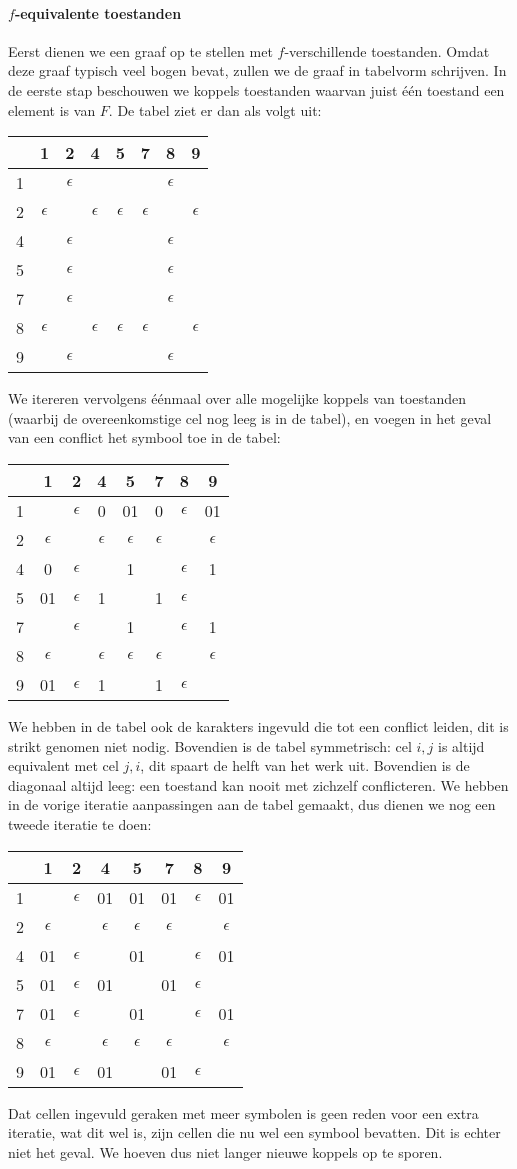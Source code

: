 \documentclass[a4paper]{article}
\newcommand{\statetable}[1]{\begin{center}\begin{tabular}{c|ccccccc}\toprule &1&2&4&5&7&8&9\\\midrule #1 \\\bottomrule\end{tabular}\end{center}}
\newcommand{\e}{\ensuremath{\epsilon}}
\begin{document}
\begin{question}
\paragraph{$f$-equivalente toestanden}
Eerst dienen we een graaf op te stellen met $f$-verschillende toestanden. Omdat deze graaf typisch veel bogen bevat, zullen we de graaf in tabelvorm schrijven. In de eerste stap beschouwen we koppels toestanden waarvan juist \'e\'en toestand een element is van $F$. De tabel ziet er dan als volgt uit:
\statetable{
1&  &\e&  &  &  &\e&  \\
2&\e&  &\e&\e&\e&  &\e\\
4&  &\e&  &  &  &\e&  \\
5&  &\e&  &  &  &\e&  \\
7&  &\e&  &  &  &\e&  \\
8&\e&  &\e&\e&\e&  &\e\\
9&  &\e&  &  &  &\e&  
}
We itereren vervolgens \'e\'enmaal over alle mogelijke koppels van toestanden (waarbij de overeenkomstige cel nog leeg is in de tabel), en voegen in het geval van een conflict het symbool toe in de tabel:
\statetable{
1&  &\e&0 &01&0 &\e&01\\
2&\e&  &\e&\e&\e&  &\e\\
4&0 &\e&  & 1&  &\e& 1\\
5&01&\e& 1&  & 1&\e&  \\
7&  &\e&  & 1&  &\e& 1\\
8&\e&  &\e&\e&\e&  &\e\\
9&01&\e& 1&  & 1&\e&  
}
We hebben in de tabel ook de karakters ingevuld die tot een conflict leiden, dit is strikt genomen niet nodig. Bovendien is de tabel symmetrisch: cel $i,j$ is altijd equivalent met cel $j,i$, dit spaart de helft van het werk uit. Bovendien is de diagonaal altijd leeg: een toestand kan nooit met zichzelf conflicteren. We hebben in de vorige iteratie aanpassingen aan de tabel gemaakt, dus dienen we nog een tweede iteratie te doen:
\statetable{
1&  &\e&01&01&01&\e&01\\
2&\e&  &\e&\e&\e&  &\e\\
4&01&\e&  &01&  &\e&01\\
5&01&\e&01&  &01&\e&  \\
7&01&\e&  &01&  &\e&01\\
8&\e&  &\e&\e&\e&  &\e\\
9&01&\e&01&  &01&\e&  
}
\end{question}
Dat cellen ingevuld geraken met meer symbolen is geen reden voor een extra iteratie, wat dit wel is, zijn cellen die nu wel een symbool bevatten. Dit is echter niet het geval. We hoeven dus niet langer nieuwe koppels op te sporen.
\end{document}
